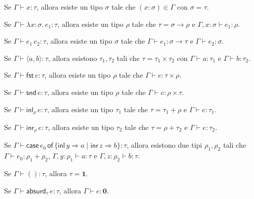 \begin{lem}
    \leavevmode
    \begin{description}[leftmargin=7.5em, style=sameline, itemsep=0.4em]
        \item [$x$] 
            Se $\Gamma \vdash x : \tau$, allora esiste un tipo $\sigma$ tale che $(x : \sigma) \in \Gamma$ con $\sigma = \tau$.
        \item [$\lambda x:\sigma. \, e_1$] 
            Se $\Gamma \vdash \lambda x:\sigma. \, e_1 : \tau$, allora esiste un tipo $\rho$ tale che $\tau = \sigma \to \rho$ e $\Gamma, x:\sigma \vdash e_1 : \rho$.
        \item [$e_1 \, e_2$] 
            Se $\Gamma \vdash e_1 \, e_2 : \tau$, allora esiste un tipo $\sigma$ tale che $\Gamma \vdash e_1 : \sigma \to \tau$ e $\Gamma \vdash e_2 : \sigma$.
        \item [$\langle a, b \rangle$] 
            Se $\Gamma \vdash \langle a, b \rangle : \tau$, allora esistono $\tau_1, \tau_2$ tali che $\tau = \tau_1 \times \tau_2$ con $\Gamma \vdash a : \tau_1$ e $\Gamma \vdash b : \tau_2$.
        \item [$\mathsf{fst} \, e$] 
            Se $\Gamma \vdash \mathsf{fst} \, e : \tau$, allora esiste un tipo $\rho$ tale che $\Gamma \vdash e : \tau \times \rho$.
        \item [$\mathsf{snd} \, e$] 
            Se $\Gamma \vdash \mathsf{snd} \, e : \tau$, allora esiste un tipo $\rho$ tale che $\Gamma \vdash e : \rho \times \tau$.
        \item [$\mathsf{inl}_{\rho} \, e$] 
            Se $\Gamma \vdash \mathsf{inl}_{\rho} \, e : \tau$, allora esiste un tipo $\tau_1$ tale che $\tau = \tau_1 + \rho$ e $\Gamma \vdash e : \tau_1$.
        \item [$\mathsf{inr}_{\rho} \, e$] 
            Se $\Gamma \vdash \mathsf{inr}_{\rho} \, e : \tau$, allora esiste un tipo $\tau_2$ tale che $\tau = \rho + \tau_2$ e $\Gamma \vdash e : \tau_2$.
        \item [$\mathsf{case} \dots$] 
            Se $\Gamma \vdash \mathsf{case} \, e_0 \, \mathsf{of} \, \{ \mathsf{inl} \, y \Rightarrow a \mid \mathsf{inr} \, z \Rightarrow b \} : \tau$, allora esistono 
            due tipi $\rho_1, \rho_2$ tali che $\Gamma \vdash e_0 : \rho_1 + \rho_2$, $\Gamma, y:\rho_1 \vdash a : \tau$ e $\Gamma, z:\rho_2 \vdash b : \tau$.
        \item [$()$] 
            Se $\Gamma \vdash () : \tau$, allora $\tau = \mathbf{1}$.
        \item [$\mathsf{absurd}_{\tau} \, e$] 
            Se $\Gamma \vdash \mathsf{absurd}_{\tau} \, e : \tau$, allora $\Gamma \vdash e : \mathbf{0}$.
    \end{description}
\end{lem}
